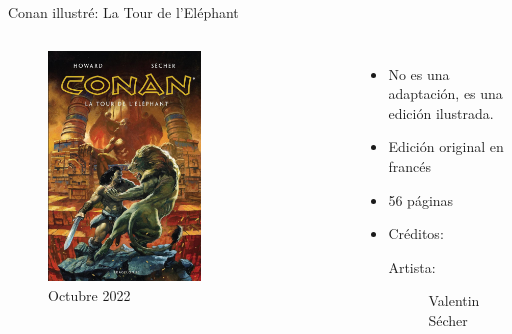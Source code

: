 \begin{frame}{Conan illustré: La Tour de l’Eléphant}
	\begin{columns}
		\begin{figure}[htb]
			\centering
			\includegraphics[width=0.6\textwidth]{img/SecherTorre}
			\caption{Octubre 2022}
		\end{figure}
		\begin{itemize}
			\item No es una adaptación, es una edición ilustrada.
			\item Edición original en francés
			\item 56 páginas
			\item Créditos:
			\begin{description}
				\item[Artista:] Valentin Sécher
			\end{description}
		\end{itemize}
	\end{columns}
\end{frame}
\note{

}
